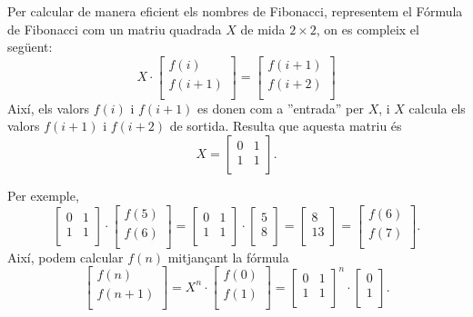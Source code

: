 \begin{samepage}
  Per calcular de manera eficient els nombres de Fibonacci,
  representem el Fórmula de Fibonacci com un matriu quadrada $X$ de
  mida $2 \times 2$, on es compleix el següent:
\[ X \cdot
 \begin{bmatrix}
  f(i) \\
  f(i+1) \\
 \end{bmatrix}
=
 \begin{bmatrix}
  f(i+1) \\
  f(i+2) \\
 \end{bmatrix}
 \]
 Així, els valors $f(i)$ i $f(i+1)$ es donen com a ''entrada'' per
 $X$, i $X$ calcula els valors $f(i+1)$ i $f(i+2)$ de sortida.  Resulta
 que aquesta matriu és
\[ X =
 \begin{bmatrix}
  0 & 1 \\
  1 & 1 \\
 \end{bmatrix}.
\]
\end{samepage}
\noindent Per exemple,
\[
 \begin{bmatrix}
  0 & 1 \\
  1 & 1 \\
 \end{bmatrix}
\cdot
 \begin{bmatrix}
  f(5) \\
  f(6) \\
 \end{bmatrix}
=
 \begin{bmatrix}
  0 & 1 \\
  1 & 1 \\
 \end{bmatrix}
\cdot
 \begin{bmatrix}
  5 \\
  8 \\
 \end{bmatrix}
=
 \begin{bmatrix}
  8 \\
  13 \\
 \end{bmatrix}
=
 \begin{bmatrix}
  f(6) \\
  f(7) \\
 \end{bmatrix}.
\]
Així, podem calcular $f(n)$ mitjançant la fórmula
\[
 \begin{bmatrix}
  f(n) \\
  f(n+1) \\
 \end{bmatrix}
=
X^n \cdot
 \begin{bmatrix}
  f(0) \\
  f(1) \\
 \end{bmatrix}
=
 \begin{bmatrix}
  0 & 1 \\
  1 & 1 \\
 \end{bmatrix}^n
\cdot
 \begin{bmatrix}
  0 \\
  1 \\
 \end{bmatrix}.
\]
